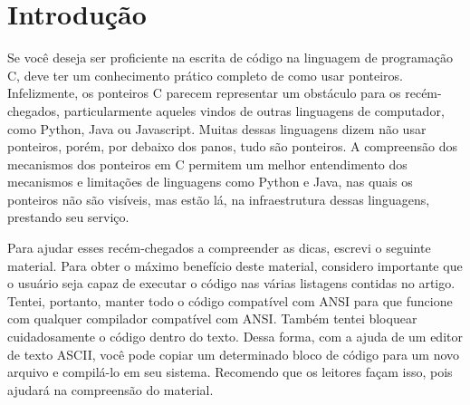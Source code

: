 
\chapter*{Introdução}
Se você deseja ser proficiente na escrita de código na linguagem de programação C, deve ter um conhecimento prático completo de como usar ponteiros. Infelizmente, os ponteiros C parecem representar um obstáculo para os recém-chegados, particularmente aqueles vindos de outras linguagens de computador, como Python, Java ou Javascript. Muitas dessas linguagens dizem não usar ponteiros, porém, por debaixo dos panos, tudo são ponteiros. A compreensão dos mecanismos dos ponteiros em C permitem um melhor entendimento dos mecanismos e limitações de linguagens como Python e Java, nas quais os ponteiros não são visíveis, mas estão lá, na infraestrutura dessas linguagens, prestando seu serviço.

Para ajudar esses recém-chegados a compreender as dicas, escrevi o seguinte material. Para obter o máximo benefício deste material, considero importante que o usuário seja capaz de executar o código nas várias listagens contidas no artigo. Tentei, portanto, manter todo o código compatível com ANSI para que funcione com qualquer compilador compatível com ANSI. Também tentei bloquear cuidadosamente o código dentro do texto. Dessa forma, com a ajuda de um editor de texto ASCII, você pode copiar um determinado bloco de código para um novo arquivo e compilá-lo em seu sistema. Recomendo que os leitores façam isso, pois ajudará na compreensão do material.

